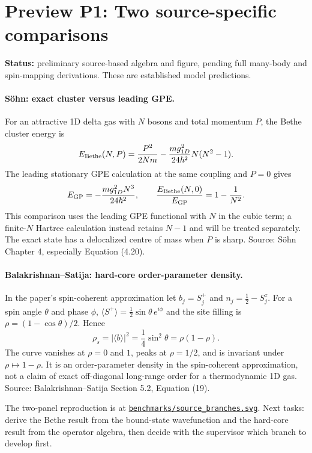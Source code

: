 \section{Preview P1: Two source-specific comparisons}
\label{sec:P01}
\noindent\textbf{Status:} preliminary source-based algebra and figure, pending full many-body and spin-mapping derivations. These are established model predictions.

\paragraph{S\"ohn: exact cluster versus leading GPE.}
For an attractive 1D delta gas with $N$ bosons and total momentum $P$, the Bethe cluster energy is
\[
E_{\rm Bethe}(N,P)=\frac{P^2}{2Nm}
-\frac{m g_{1D}^2}{24\hbar^2}N(N^2-1).
\]
The leading stationary GPE calculation at the same coupling and $P=0$ gives
\[
E_{\rm GP}=-\frac{mg_{1D}^2N^3}{24\hbar^2},\qquad
\frac{E_{\rm Bethe}(N,0)}{E_{\rm GP}}=1-\frac1{N^2}.
\]
This comparison uses the leading GPE functional with $N$ in the cubic term; a finite-$N$ Hartree calculation instead retains $N-1$ and will be treated separately. The exact state has a delocalized centre of mass when $P$ is sharp. Source: S\"ohn Chapter 4, especially Equation (4.20).

\paragraph{Balakrishnan--Satija: hard-core order-parameter density.}
In the paper's spin-coherent approximation let $b_j=S_j^+$ and $n_j=\frac12-S_j^z$. For a spin angle $\theta$ and phase $\phi$, $\langle S^+\rangle=\frac12\sin\theta\,e^{i\phi}$ and the site filling is $\rho=(1-\cos\theta)/2$. Hence
\[
\rho_s=|\langle b\rangle|^2=\frac14\sin^2\theta=\rho(1-\rho).
\]
The curve vanishes at $\rho=0$ and $1$, peaks at $\rho=1/2$, and is invariant under $\rho\mapsto1-\rho$. It is an order-parameter density in the spin-coherent approximation, not a claim of exact off-diagonal long-range order for a thermodynamic 1D gas. Source: Balakrishnan--Satija Section 5.2, Equation (19).

The two-panel reproduction is at \href{https://github.com/Kshitijsqdn303/Pure-Quantum-Mechanics/blob/main/BEC-Solitons-Research-Notebook/benchmarks/source_branches.svg}{\texttt{benchmarks/source\_branches.svg}}. Next tasks: derive the Bethe result from the bound-state wavefunction and the hard-core result from the operator algebra, then decide with the supervisor which branch to develop first.
